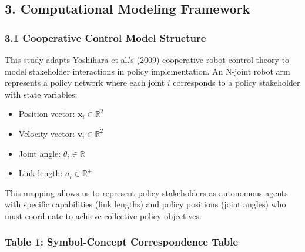 \subsection{3. Computational Modeling
Framework}\label{computational-modeling-framework}

\subsubsection{3.1 Cooperative Control Model
Structure}\label{cooperative-control-model-structure}

This study adapts Yoshihara et al.'s (2009) cooperative robot control
theory to model stakeholder interactions in policy implementation. An
N-joint robot arm represents a policy network where each joint \(i\)
corresponds to a policy stakeholder with state variables:

\begin{itemize}
\tightlist
\item
  Position vector: \(\mathbf{x}_i \in \mathbb{R}^2\)
\item
  Velocity vector: \(\mathbf{v}_i \in \mathbb{R}^2\)
\item
  Joint angle: \(\theta_i \in \mathbb{R}\)　　
\item
  Link length: \(a_i \in \mathbb{R}^+\)
\end{itemize}

This mapping allows us to represent policy stakeholders as autonomous
agents with specific capabilities (link lengths) and policy positions
(joint angles) who must coordinate to achieve collective policy
objectives.

\subsubsection{Table 1: Symbol-Concept Correspondence
Table}\label{table-1-symbol-concept-correspondence-table}

